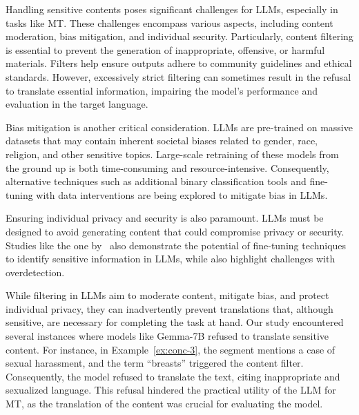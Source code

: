 Handling sensitive contents poses significant challenges for LLMs, especially in tasks like MT. These challenges encompass various aspects, including content moderation, bias mitigation, and individual security. Particularly, content filtering is essential to prevent the generation of inappropriate, offensive, or harmful materials. Filters help ensure outputs adhere to community guidelines and ethical standards. However, excessively strict filtering can sometimes result in the refusal to translate essential information, impairing the model's performance and evaluation in the target language.

Bias mitigation is another critical consideration. LLMs are pre-trained on massive datasets that may contain inherent societal biases related to gender, race, religion, and other sensitive topics. Large-scale retraining of these models from the ground up is both time-consuming and resource-intensive. Consequently, alternative techniques such as additional binary classification tools \parencite{yifei-etal-2023-conceptor} and fine-tuning with data interventions \parencite{thakur2023language} are being explored to mitigate bias in LLMs.

Ensuring individual privacy and security is also paramount. LLMs must be designed to avoid generating content that could compromise privacy or security. Studies like the one by~\textcite{szawerna-etal-2024-detecting} also demonstrate the potential of fine-tuning techniques to identify sensitive information in LLMs, while also highlight challenges with overdetection.

While filtering in LLMs aim to moderate content, mitigate bias, and protect individual privacy, they can inadvertently prevent translations that, although sensitive, are necessary for completing the task at hand. Our study encountered several instances where models like Gemma-7B refused to translate sensitive content. For instance, in Example~\ref{ex:conc-3}, the segment mentions a case of sexual harassment, and the term ``breasts'' triggered the content filter. Consequently, the model refused to translate the text, citing inappropriate and sexualized language. This refusal hindered the practical utility of the LLM for MT, as the translation of the content was crucial for evaluating the model.

